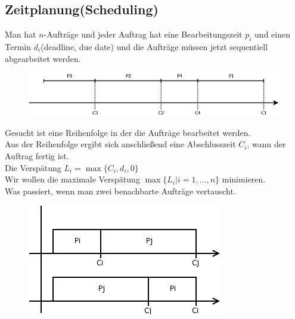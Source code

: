 \subsection{Zeitplanung(Scheduling)}
Man hat $n$-Aufträge und jeder Auftrag hat eine Bearbeitungszeit $p_i$ und einen Termin $d_i$(deadline, due date) und die Aufträge müssen jetzt sequentiell abgearbeitet werden.\\
\begin{figure}[h]
    \begin{center}
        \includegraphics[width=\textwidth / 2]{../GFX/vl13_6.png}
        \label{fig:vl13_1}
    \end{center}
\end{figure}
Gesucht ist eine Reihenfolge in der die Aufträge bearbeitet werden.\\
Aus der Reihenfolge ergibt sich anschließend eine Abschlusszeit $C_i$, wann der Auftrag fertig ist.\\
Die Verspätung $L_i = \max \{C_i, d_i, 0\}$\\
Wir wollen die maximale Verspätung $\max\{L_i | i = 1,...,n\}$ minimieren.\\
Was passiert, wenn man zwei benachbarte Aufträge vertauscht. \\
\begin{figure}[h]
    \begin{center}
        \includegraphics[width=\textwidth / 2]{../GFX/vl13_7.png}
        \label{fig:vl13_1}
    \end{center}
\end{figure}
